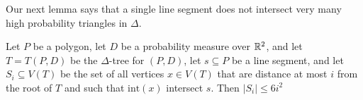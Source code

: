 \documentclass[lotsofwhite]{patmorin}
\newcommand{\interior}{\mathrm{int}}
\begin{document}
%


Our next lemma says that a single line segment does not intersect
very many high probability triangles in $\Delta$.

\begin{lem}
Let $P$ be a polygon, let $D$ be a probability measure over $\mathbb{R}^2$, 
and let $T=T(P,D)$ be the $\Delta$-tree for $(P,D)$, let $s\subseteq P$ be
a line segment, and let $S_i\subseteq V(T)$ be the set of all vertices
$x\in V(T)$ that are distance at most $i$ from the root of $T$ and
such that
$\interior(x)$ intersect $s$.  Then $|S_i|\le 6i^2$
\end{lem}
\end{document}
